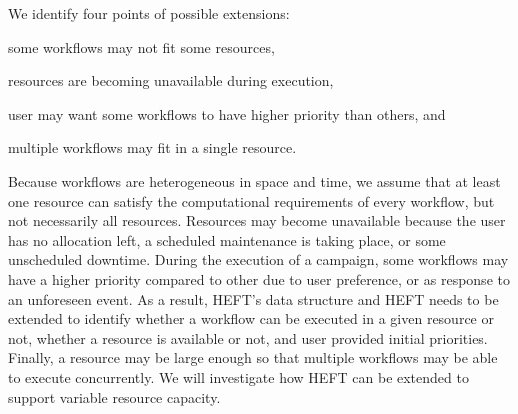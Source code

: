 We identify four points of possible extensions:
\begin{inparaenum}[(i)]
    \item some workflows may not fit some resources,
    \item resources are becoming unavailable during execution,
    \item user may want some workflows to have higher priority than others, and
    \item multiple workflows may fit in a single resource.
\end{inparaenum}
Because workflows are heterogeneous in space and time, we assume that at least one resource can satisfy the computational requirements of every workflow, but not necessarily all resources.
Resources may become unavailable because the user has no allocation left, a scheduled maintenance is taking place, or some unscheduled downtime.
During the execution of a campaign, some workflows may have a higher priority compared to other due to user preference, or as response to an unforeseen event.
As a result, HEFT's data structure and HEFT needs to be extended to identify whether a workflow can be executed in a given resource or not, whether a resource is available or not, and user provided initial priorities.
Finally, a resource may be large enough so that multiple workflows may be able to execute concurrently.
We will investigate how HEFT can be extended to support variable resource capacity.


